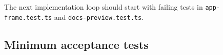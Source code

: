 The next implementation loop should start with failing tests in \texttt{a\allowbreak{}p\allowbreak{}p\allowbreak{}-\allowbreak{}f\allowbreak{}r\allowbreak{}a\allowbreak{}m\allowbreak{}e\allowbreak{}.\allowbreak{}t\allowbreak{}e\allowbreak{}s\allowbreak{}t\allowbreak{}.\allowbreak{}t\allowbreak{}s} and \texttt{d\allowbreak{}o\allowbreak{}c\allowbreak{}s\allowbreak{}-\allowbreak{}p\allowbreak{}r\allowbreak{}e\allowbreak{}v\allowbreak{}i\allowbreak{}e\allowbreak{}w\allowbreak{}.\allowbreak{}t\allowbreak{}e\allowbreak{}s\allowbreak{}t\allowbreak{}.\allowbreak{}t\allowbreak{}s}.

\subsection{Minimum acceptance tests}\label{record-057-minimum-acceptance-tests}

